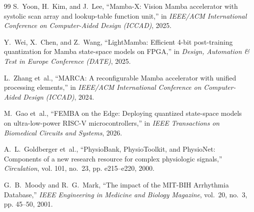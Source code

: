 \documentclass[11pt,a4paper,oneside]{report}
\begin{document}
\begin{thebibliography}{99}
S.~Yoon, H.~Kim, and J.~Lee, ``Mamba-X: Vision Mamba accelerator with systolic scan array and lookup-table function unit,'' in \emph{IEEE/ACM International Conference on Computer-Aided Design (ICCAD)}, 2025.

Y.~Wei, X.~Chen, and Z.~Wang, ``LightMamba: Efficient 4-bit post-training quantization for Mamba state-space models on FPGA,'' in \emph{Design, Automation \& Test in Europe Conference (DATE)}, 2025.

L.~Zhang et~al., ``MARCA: A reconfigurable Mamba accelerator with unified processing elements,'' in \emph{IEEE/ACM International Conference on Computer-Aided Design (ICCAD)}, 2024.

M.~Gao et~al., ``FEMBA on the Edge: Deploying quantized state-space models on ultra-low-power RISC-V microcontrollers,'' in \emph{IEEE Transactions on Biomedical Circuits and Systems}, 2026.

A.~L.~Goldberger et~al., ``PhysioBank, PhysioToolkit, and PhysioNet: Components of a new research resource for complex physiologic signals,'' \emph{Circulation}, vol. 101, no.~23, pp. e215--e220, 2000.

G.~B.~Moody and R.~G.~Mark, ``The impact of the MIT-BIH Arrhythmia Database,'' \emph{IEEE Engineering in Medicine and Biology Magazine}, vol.~20, no.~3, pp. 45--50, 2001.

\end{thebibliography}
\end{document}
